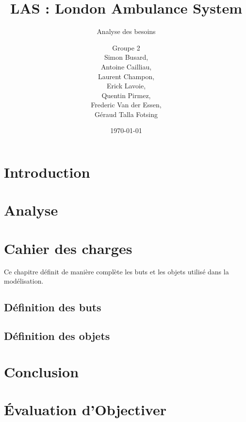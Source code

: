 \documentclass{report}
\title{LAS : London Ambulance System}
\subtitle{Analyse des besoins}
\author{\normalsize{Groupe 2}\\
\footnotesize{
Simon Busard, \\
Antoine Cailliau, \\
Laurent Champon,\\
Erick Lavoie, \\
Quentin Pirmez,\\
Frederic Van der Essen, \\
Géraud Talla Fotsing}}
\date{\today}
\begin{document}
\renewcommand{\figurename}{\sf Figure}
\setlength{\parskip}{1em}


\maketitle
\setcounter{tocdepth}{1}
\tableofcontents

\chapter*{Introduction}
	
	
\chapter{Analyse}
		
	
\chapter{Cahier des charges}
	Ce chapitre définit de manière complète les buts et les objets utilisé
	dans la modélisation.

	\section{Définition des buts}\label{section:buts2}
	

	\section{Définition des objets}\label{section:objets2}
		

\chapter*{Conclusion}
	

\chapter*{Évaluation d'Objectiver}
	
\end{document}
